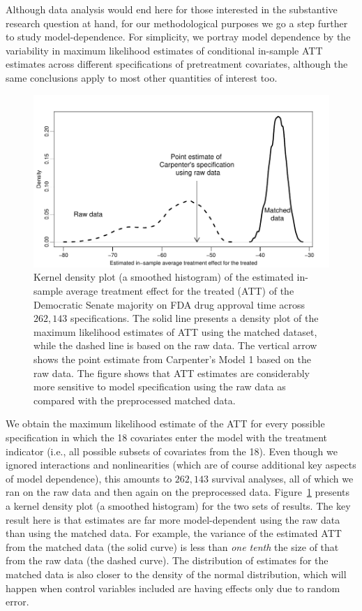 \documentclass[11pt,titlepage]{article}
\begin{document}
Although data analysis would end here for those interested in the
substantive research question at hand, for our methodological purposes
we go a step further to study model-dependence.  For simplicity, we
portray model dependence by the variability in maximum likelihood
estimates of conditional in-sample ATT estimates across different
specifications of pretreatment covariates, although the same
conclusions apply to most other quantities of interest too.
\begin{figure}[t] 
 \begin{center}
   \includegraphics{figs/fdadens.pdf}
  \end{center}
  \vspace{-0.15in}
  \caption{Kernel density plot (a smoothed histogram) of the estimated
    in-sample average treatment effect for the treated (ATT) of the
    Democratic Senate majority on FDA drug approval time across
    $262,143$ specifications. The solid line presents a density plot
    of the maximum likelihood estimates of ATT using the matched
    dataset, while the dashed line is based on the raw data.  The
    vertical arrow shows the point estimate from Carpenter's Model 1
    based on the raw data.  The figure shows that ATT estimates are
    considerably more sensitive to model specification using the raw
    data as compared with the preprocessed matched data.}
  \label{fg:fdadens}
\end{figure}

We obtain the maximum likelihood estimate of the ATT for every
possible specification in which the 18 covariates enter the model with
the treatment indicator (i.e., all possible subsets of covariates from
the 18).  Even though we ignored interactions and nonlinearities
(which are of course additional key aspects of model dependence), this
amounts to $262,143$ survival analyses, all of which we ran on the raw
data and then again on the preprocessed data.  Figure~\ref{fg:fdadens}
presents a kernel density plot (a smoothed histogram) for the two sets
of results.  The key result here is that estimates are far more
model-dependent using the raw data than using the matched data.  For
example, the variance of the estimated ATT from the matched data (the
solid curve) is less than \emph{one tenth} the size of that from the
raw data (the dashed curve).  The distribution of estimates for the
matched data is also closer to the density of the normal distribution,
which will happen when control variables included are having effects
only due to random error.
\end{document}
